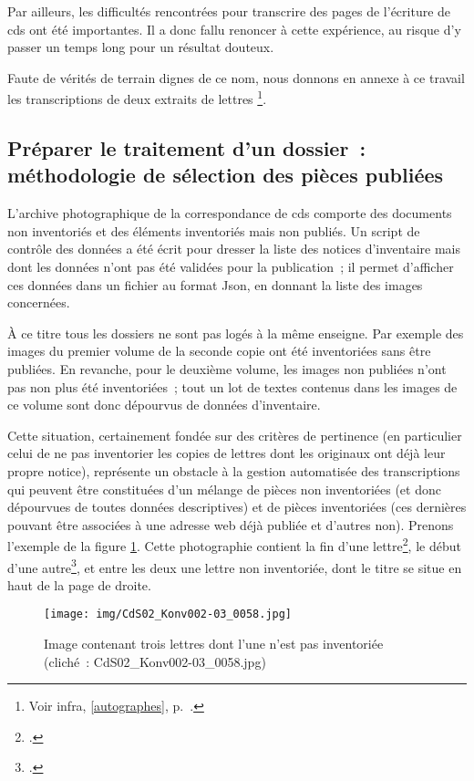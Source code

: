 \documentclass[a4paper,12pt,twoside]{book}
\begin{document}
				Par ailleurs, les difficultés rencontrées pour transcrire des pages de l'écriture de \gls{cds} ont été importantes. Il a donc fallu renoncer à cette expérience, au risque d'y passer un temps long pour un résultat douteux.
				
				Faute de vérités de terrain dignes de ce nom, nous donnons en annexe à ce travail les transcriptions de deux extraits de lettres
				\footnote{Voir infra, \ref{autographes}, p.~\pageref{autographes}.}.
		
			\subsection[Préparer le traitement d'un dossier]{Préparer le traitement d'un dossier~: méthodologie de sélection des pièces publiées}
				L'archive photographique de la correspondance de \gls{cds} comporte des documents non inventoriés et des éléments inventoriés mais non publiés. Un script de contrôle des données a été écrit pour dresser la liste des notices d'inventaire mais dont les données n'ont pas été validées pour la publication\cite{biayDonneesNonPublieesPy2022}~; il permet d'afficher ces données dans un fichier au format Json, en donnant la liste des images concernées.
				
				À ce titre tous les dossiers ne sont pas logés à la même enseigne. Par exemple des images du premier volume de la seconde copie\cite{CdS02001330} ont été inventoriées sans être publiées. En revanche, pour le deuxième volume\cite{CdS02001369}, les images non publiées n'ont pas non plus été inventoriées~; tout un lot de textes contenus dans les images de ce volume sont donc dépourvus de données d'inventaire. 
				
				Cette situation, certainement fondée sur des critères de pertinence (en particulier celui de ne pas inventorier les copies de lettres dont les originaux ont déjà leur propre notice), représente un obstacle à la gestion automatisée des transcriptions qui peuvent être constituées d'un mélange de pièces non inventoriées (et donc dépourvues de toutes données descriptives) et de pièces inventoriées (ces dernières pouvant être associées à une adresse web déjà publiée et d'autres non). Prenons l'exemple de la figure \ref{non-invent-58}. Cette photographie contient la fin d'une lettre\footcite{CdS02057058}, le début d'une autre\footcite{CdS02058059}, et entre les deux une lettre non inventoriée, dont le titre se situe en haut de la page de droite.
				
				\begin{figure}[!h]
					\centering
					\texttt{[image: img/CdS02\_Konv002-03\_0058.jpg]}
					\caption{Image contenant trois lettres dont l'une n'est pas inventoriée (cliché~: CdS02\_Konv002-03\_0058.jpg)}
					\label{non-invent-58}
				\end{figure}
				
\end{document}
